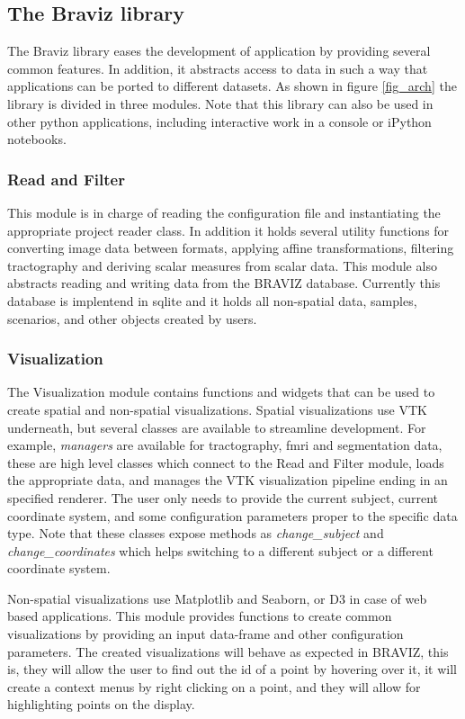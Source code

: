 \documentclass[twocolumn]{svjour3}
\begin{document}
\subsection{The Braviz library}

The Braviz library eases the development of application by providing several common features. In addition, it abstracts access to data in such a way that applications can be ported to different datasets. As shown in figure \ref{fig_arch} the library is divided in three modules. Note that this library can also be used in other python applications, including interactive work in a console or iPython notebooks.

\subsubsection{Read and Filter}

This module is in charge of reading the configuration file and instantiating the appropriate project reader class. In addition it holds several utility functions for converting image data between formats, applying affine transformations, filtering tractography and deriving scalar measures from scalar data. This module also abstracts reading and writing data from the BRAVIZ database. Currently this database is implentend in sqlite and it holds all non-spatial data, samples, scenarios, and other objects created by users.

\subsubsection{Visualization}

The Visualization module contains functions and widgets that can be used to create spatial and non-spatial visualizations. Spatial visualizations use VTK underneath, but several classes are available to streamline development. For example, \emph{managers} are available for tractography, fmri and segmentation data, these are high level classes which connect to the Read and Filter module, loads the appropriate data, and manages the VTK visualization pipeline ending in an specified renderer. The user only needs to provide the current subject, current coordinate system, and some configuration parameters proper to the specific data type. Note that these classes expose methods as \emph{change\_subject} and \emph{change\_coordinates} which helps switching to a different subject or a different coordinate system.

Non-spatial visualizations use Matplotlib and Seaborn, or D3 in case of web based applications. This module provides functions to create common visualizations by providing an input data-frame and other configuration parameters. The created visualizations will behave as expected in BRAVIZ, this is, they will allow the user to find out the id of a point by hovering over it, it will create a context menus by right clicking on a point, and they will allow for highlighting points on the display. 
\end{document}
